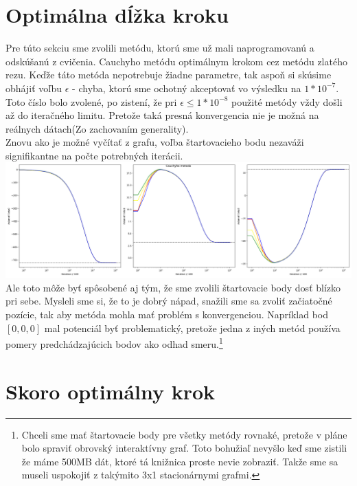 \documentclass{article}
\begin{document}
\section{Optimálna dĺžka kroku}
Pre túto sekciu sme zvolili metódu, ktorú sme už mali naprogramovanú a odskúšanú z cvičenia. Cauchyho metódu  optimálnym krokom cez metódu zlatého rezu. Keďže táto metóda nepotrebuje žiadne parametre, tak aspoň si skúsime obhájiť voľbu $\epsilon$ - chyba, ktorú sme ochotný akceptovať vo výsledku na $1*10^{-7}$. Toto číslo bolo zvolené, po zistení, že pri $\epsilon \leq 1*10^{-8}$ použité metódy vždy došli až do iteračného limitu. Pretože taká presná konvergencia nie je možná na reálnych dátach(Zo zachovaním generality).\\ Znovu ako je možné vyčítať z grafu, voľba štartovacieho bodu nezaváži signifikantne na počte potrebných iterácii. \\\includegraphics[width=\textwidth]{cauchy.png}  Ale toto môže byť spôsobené aj tým, že sme zvolili štartovacie body dosť blízko pri sebe. Mysleli sme si, že to je dobrý nápad, snažili sme sa zvoliť začiatočné pozície, tak aby metóda mohla mať problém s konvergenciou. Napríklad bod $\left[0,0,0\right]$ mal potenciál byť problematický, pretože jedna z iných metód používa pomery predchádzajúcich bodov ako odhad smeru.\footnote{Chceli sme mať štartovacie body pre všetky metódy rovnaké, pretože v pláne bolo spraviť obrovský interaktívny graf. Toto bohužiaľ nevyšlo keď sme zistili že máme 500MB dát, ktoré tá knižnica proste nevie zobraziť. Takže sme sa museli uspokojiť z takýmito 3x1 stacionárnymi grafmi.}\\


\section{Skoro optimálny krok}
\end{document}
